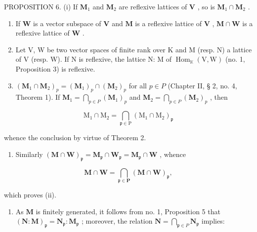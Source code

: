 PROPOSITION 6. (i) If \(\mathbf{M}_1\) and \(\mathbf{M}_2\) are reflexive lattices of \(\mathbf{V}\) , so is \(\mathbf{M}_1 \cap \mathbf{M}_2\) .

\begin{enumerate}
\def\labelenumi{(\roman{enumi})}
\setcounter{enumi}{1}
\item
  If \(\mathbf{W}\) is a vector subspace of \(\mathbf{V}\) and \(\mathbf{M}\) is a reflexive lattice of \(\mathbf{V}\) , \(\mathbf{M} \cap \mathbf{W}\) is a reflexive lattice of \(\mathbf{W}\) .
\item
  Let V, W be two vector spaces of finite rank over K and M (resp. N) a lattice of V (resp. W). If N is reflexive, the lattice N: M of \(\operatorname{Hom}_{\mathbb{K}}(\mathrm{V}, \mathrm{W})\) (no. 1, Proposition 3) is reflexive.
\item
  \((\mathbf{M}_1 \cap \mathbf{M}_2)_p = (\mathbf{M}_1)_p \cap (\mathbf{M}_2)_p\) for all \(p \in P\) (Chapter II, § 2, no. 4, Theorem 1). If \(\mathbf{M}_1 = \bigcap_{p \in P} (\mathbf{M}_1)_p\) and \(\mathbf{M}_2 = \bigcap_{p \in P} (\mathbf{M}_2)_p\) , then
\end{enumerate}

\[
\mathrm{M} _ {1} \cap \mathrm{M} _ {2} = \bigcap_ {\mathfrak {p} \in \mathrm{P}} (\mathrm{M} _ {1} \cap \mathrm{M} _ {2}) _ {\mathfrak {p}}
\]

whence the conclusion by virtue of Theorem 2.

\begin{enumerate}
\def\labelenumi{(\roman{enumi})}
\setcounter{enumi}{1}
\tightlist
\item
  Similarly \((\mathbf{M} \cap \mathbf{W})_{\mathfrak{p}} = \mathbf{M}_{\mathfrak{p}} \cap \mathbf{W}_{\mathfrak{p}} = \mathbf{M}_{\mathfrak{p}} \cap \mathbf{W}\) , whence
\end{enumerate}

\[
\mathbf {M} \cap \mathbf {W} = \bigcap_ {\mathfrak {p} \in \mathbf {P}} (\mathbf {M} \cap \mathbf {W}) _ {\mathfrak {p}},
\]

which proves (ii).

\begin{enumerate}
\def\labelenumi{(\roman{enumi})}
\setcounter{enumi}{2}
\tightlist
\item
  As \(\mathbf{M}\) is finitely generated, it follows from no. 1, Proposition 5 that \((\mathbf{N}:\mathbf{M})_{\mathfrak{p}} = \mathbf{N}_{\mathfrak{p}}:\mathbf{M}_{\mathfrak{p}}\) ; moreover, the relation \(\mathbf{N} = \bigcap_{\mathfrak{p}\in P}\mathbf{N}_{\mathfrak{p}}\) implies:
\end{enumerate}

